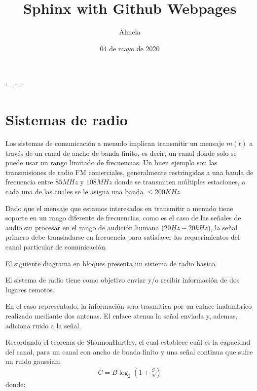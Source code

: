 \documentclass[letterpaper,11pt,spanish]{sphinxmanual}
\title{Sphinx with Github Webpages}
\date{04 de mayo de 2020}
\author{Almela}
\let\sphinxpxdimen\pdfpxdimen\else\newdimen\sphinxpxdimen
\begin{document}
\ifdefined\shorthandoff
  \ifnum\catcode`\=\string=\active\shorthandoff{=}\fi
  \ifnum\catcode`\"=\active{}\fi
\fi

\pagestyle{empty}
\sphinxmaketitle
\pagestyle{plain}
\sphinxtableofcontents
\pagestyle{normal}
\label{\detokenize{index::doc}}



\chapter{Sistemas de radio}
\label{\detokenize{introduccion/sistemas:Sistemas-de-radio}}\label{\detokenize{introduccion/sistemas::doc}}
Los sistemas de comunicación a menudo implican transmitir un mensaje \(m(t)\) a través de un canal de ancho de banda finito, es decir, un canal donde solo se puede usar un rango limitado de frecuencias. Un buen ejemplo son las transmisiones de radio FM comerciales, generalmente restringidas a una banda de frecuencia entre \(85MHz\) y \(108MHz\) donde se transmiten múltiples estaciones, a cada una de las cuales se le asigna una banda \(\le 200 KHz\).

Dado que el mensaje que estamos interesados en transmitir a menudo tiene soporte en un rango diferente de frecuencias, como es el caso de las señales de audio sin procesar en el rango de audición humana (\(20 Hz - 20 kHz\)), la señal primero debe transladarse en frecuencia para satisfacer los requerimientos del canal particular de comunicación.

El siguiente diagrama en bloques presenta un sistema de radio basico.

\sphinxincludegraphics[width=731\sphinxpxdimen,height=276\sphinxpxdimen]{{radio1}.png}

El sistema de radio tiene como objetivo enviar y/o recibir información de dos lugares remotos.

En el caso representado, la información sera trasmitica por un enlace inalambrico realizado mediante dos antenas. El enlace atenua la señal enviada y, ademas, adiciona ruido a la señal.

Recordando el teorema de Shannon\sphinxhyphen{}Hartley, el cual establece cuál es la capacidad del canal, para un canal con ancho de banda finito y una señal continua que sufre un ruido gaussian:
\begin{equation*}
\begin{split}C=B\log _{2}\left(1+{\frac {S}{N}}\right)\end{split}
\end{equation*}
donde:
\end{document}
